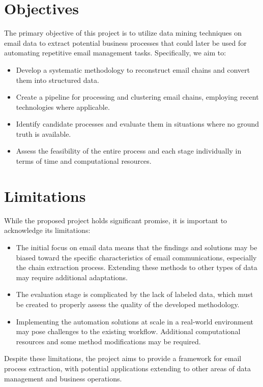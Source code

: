 \section{Objectives}
\label{sec:objectives}

 The primary objective of this project is to utilize data mining techniques on email data to extract potential business processes that could later be used for automating repetitive email management tasks. Specifically, we aim to:
 \begin{itemize}
    \item Develop a systematic methodology to reconstruct email chains and convert them into structured data.
    \item Create a pipeline for processing and clustering email chains, employing recent technologies where applicable.
    \item Identify candidate processes and evaluate them in situations where no ground truth is available.
    \item Assess the feasibility of the entire process and each stage individually in terms of time and computational resources.
  \end{itemize}


\section{Limitations}
\label{sec:limitations}

While the proposed project holds significant promise, it is important to acknowledge its limitations:
\begin{itemize}
    \item The initial focus on email data means that the findings and solutions may be biased toward the specific characteristics of email communications, especially the chain extraction process. Extending these methods to other types of data may require additional adaptations.
    \item The evaluation stage is complicated by the lack of labeled data, which must be created to properly assess the quality of the developed methodology.
    \item Implementing the automation solutions at scale in a real-world environment may pose challenges to the existing workflow. Additional computational resources and some method modifications may be required.
\end{itemize}

Despite these limitations, the project aims to provide a framework for email process extraction, with potential applications extending to other areas of data management and business operations.